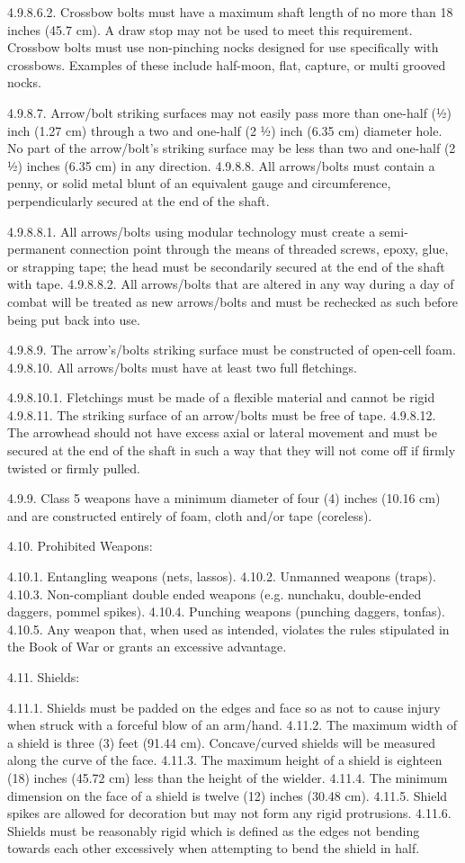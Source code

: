\documentclass[12pt]{article}
\begin{document}
\begin{level}[start=0]
4.9.8.6.2. Crossbow bolts must have a maximum shaft length of no more than 18 inches (45.7 cm). A draw stop may not be used to meet this requirement. Crossbow bolts must use non-pinching nocks designed for use specifically with crossbows. Examples of these include half-moon, flat, capture, or multi grooved nocks.

4.9.8.7. Arrow/bolt striking surfaces may not easily pass more than one-half (½) inch (1.27 cm) through a two and one-half (2 ½) inch (6.35 cm) diameter hole. No part of the arrow/bolt’s striking surface may be less than two and one-half (2 ½) inches (6.35 cm) in any direction.
4.9.8.8. All arrows/bolts must contain a penny, or solid metal blunt of an equivalent gauge and circumference, perpendicularly secured at the end of the shaft.

4.9.8.8.1. All arrows/bolts using modular technology must create a semi-permanent connection point through the means of threaded screws, epoxy, glue, or strapping tape; the head must be secondarily secured at the end of the shaft with tape.
4.9.8.8.2. All arrows/bolts that are altered in any way during a day of combat will be treated as new arrows/bolts and must be rechecked as such before being put back into use.

4.9.8.9. The arrow’s/bolts striking surface must be constructed of open-cell foam.
4.9.8.10. All arrows/bolts must have at least two full fletchings.

         4.9.8.10.1. Fletchings must be made of a flexible material and cannot be rigid
4.9.8.11. The striking surface of an arrow/bolts must be free of tape.
4.9.8.12. The arrowhead should not have excess axial or lateral movement and must be secured at the end of the shaft in such a way that they will not come off if firmly twisted or firmly pulled.

4.9.9. Class 5 weapons have a minimum diameter of four (4) inches (10.16 cm) and are constructed entirely of foam, cloth and/or tape (coreless).

4.10. Prohibited Weapons:

4.10.1. Entangling weapons (nets, lassos).
4.10.2. Unmanned weapons (traps).
4.10.3. Non-compliant double ended weapons (e.g. nunchaku, double-ended daggers, pommel spikes).
4.10.4. Punching weapons (punching daggers, tonfas).
4.10.5. Any weapon that, when used as intended, violates the rules stipulated in the Book of War or grants an excessive advantage.

4.11. Shields:

4.11.1. Shields must be padded on the edges and face so as not to cause injury when struck with a forceful blow of an arm/hand.
4.11.2. The maximum width of a shield is three (3) feet (91.44 cm). Concave/curved shields will be measured along the curve of the face.
4.11.3. The maximum height of a shield is eighteen (18) inches (45.72 cm) less than the height of the wielder.
4.11.4. The minimum dimension on the face of a shield is twelve (12) inches (30.48 cm).
4.11.5. Shield spikes are allowed for decoration but may not form any rigid protrusions.
4.11.6. Shields must be reasonably rigid which is defined as the edges not bending towards each other excessively when attempting to bend the shield in half.


\end{level}
\end{document}
